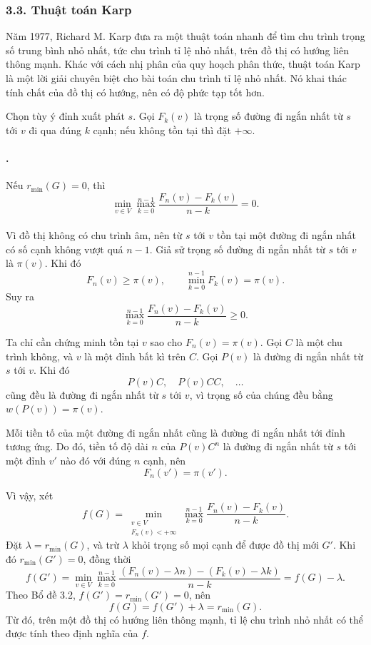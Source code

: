 \documentclass[11pt]{article}
\begin{document}
\subsubsection*{3.3. Thuật toán Karp}

Năm 1977, Richard M. Karp đưa ra một thuật toán nhanh để tìm chu trình trọng
số trung bình nhỏ nhất, tức chu trình tỉ lệ nhỏ nhất, trên đồ thị có hướng liên
thông mạnh. Khác với cách nhị phân của quy hoạch phân thức, thuật toán Karp là
một lời giải chuyên biệt cho bài toán chu trình tỉ lệ nhỏ nhất. Nó khai thác
tính chất của đồ thị có hướng, nên có độ phức tạp tốt hơn.

Chọn tùy ý đỉnh xuất phát \(s\). Gọi \(F_k(v)\) là trọng số đường đi ngắn nhất
từ \(s\) tới \(v\) đi qua đúng \(k\) cạnh; nếu không tồn tại thì đặt
\(+\infty\).

\paragraph{.}
Nếu \(r_{\min}(G)=0\), thì
\[
  \min_{v\in V}\max_{k=0}^{n-1}\frac{F_n(v)-F_k(v)}{n-k}=0.
\]

\paragraph{}
Vì đồ thị không có chu trình âm, nên từ \(s\) tới \(v\) tồn tại một đường đi
ngắn nhất có số cạnh không vượt quá \(n-1\). Giả sử trọng số đường đi ngắn nhất
từ \(s\) tới \(v\) là \(\pi(v)\). Khi đó
\[
  F_n(v)\ge \pi(v),\qquad
  \min_{k=0}^{n-1}F_k(v)=\pi(v).
\]
Suy ra
\[
  \max_{k=0}^{n-1}\frac{F_n(v)-F_k(v)}{n-k}\ge0.
\]

Ta chỉ cần chứng minh tồn tại \(v\) sao cho \(F_n(v)=\pi(v)\). Gọi \(C\) là
một chu trình không, và \(v\) là một đỉnh bất kì trên \(C\). Gọi \(P(v)\) là
đường đi ngắn nhất từ \(s\) tới \(v\). Khi đó
\[
  P(v)C,\quad P(v)CC,\quad \ldots
\]
cũng đều là đường đi ngắn nhất từ \(s\) tới \(v\), vì trọng số của chúng đều
bằng \(w(P(v))=\pi(v)\).

Mỗi tiền tố của một đường đi ngắn nhất cũng là đường đi ngắn nhất tới đỉnh
tương ứng. Do đó, tiền tố độ dài \(n\) của \(P(v)C^n\) là đường đi ngắn nhất
từ \(s\) tới một đỉnh \(v'\) nào đó với đúng \(n\) cạnh, nên
\[
  F_n(v')=\pi(v').
\]

Vì vậy, xét
\[
  f(G)=
  \min_{\substack{v\in V\\F_n(v)<+\infty}}
  \max_{k=0}^{n-1}\frac{F_n(v)-F_k(v)}{n-k}.
\]
Đặt \(\lambda=r_{\min}(G)\), và trừ \(\lambda\) khỏi trọng số mọi cạnh để được
đồ thị mới \(G'\). Khi đó \(r_{\min}(G')=0\), đồng thời
\[
  f(G')
  =
  \min_{v\in V}\max_{k=0}^{n-1}
  \frac{(F_n(v)-\lambda n)-(F_k(v)-\lambda k)}{n-k}
  =
  f(G)-\lambda.
\]
Theo Bổ đề 3.2, \(f(G')=r_{\min}(G')=0\), nên
\[
  f(G)=f(G')+\lambda=r_{\min}(G).
\]
Từ đó, trên một đồ thị có hướng liên thông mạnh, tỉ lệ chu trình nhỏ nhất có
thể được tính theo định nghĩa của \(f\).
\end{document}
